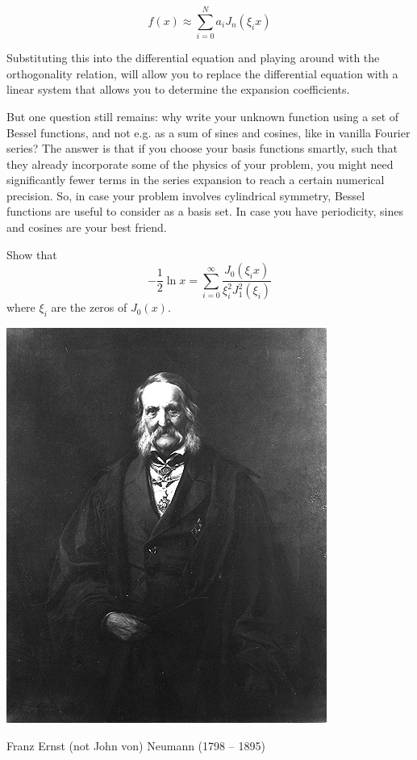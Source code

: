 \begin{equation}
f(x) \approx \sum_{i=0}^{N} a_i J_n(\xi_i x)
\end{equation} 

Substituting this into the differential equation and playing around with the orthogonality relation, will allow you to replace the differential equation with a linear system that allows you to determine the expansion coefficients.

But one question still remains: why write your unknown function using a set of Bessel functions, and not e.g. as a sum of sines and cosines, like in vanilla Fourier series? The answer is that if you choose your basis functions smartly, such that they already incorporate some of the physics of your problem, you might need significantly fewer terms in the series expansion to reach a certain numerical precision. So, in case your problem involves cylindrical symmetry, Bessel functions are useful to consider as a basis set. In case you have periodicity, sines and cosines are your best friend.

\begin{exer}
Show that
$$-\frac{1}{2} \ln x = \sum_{i=0}^{\infty} \frac{J_0(\xi_i x)}{\xi_i^2 J_1^2(\xi_i)}$$
where $\xi_i$ are the zeros of $J_0(x)$.
\end{exer}



\pagebreak



\begin{marginfigure}[0.3cm]
  \includegraphics{bessel/figures/f_neumann}
  \caption{Franz Ernst (not John von) Neumann (1798 – 1895)}
\end{marginfigure}

